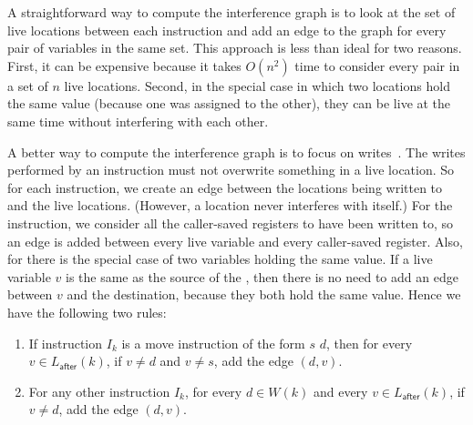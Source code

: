 \documentclass[7x10]{TimesAPriori_MIT}%
\numberwithin{theorem}{chapter}
\numberwithin{definition}{chapter}
\numberwithin{equation}{chapter}
\begin{document}
A straightforward way to compute the interference graph is to look at
the set of live locations between each instruction and add an edge to
the graph for every pair of variables in the same set.  This approach
is less than ideal for two reasons. First, it can be expensive because
it takes $O(n^2)$ time to consider every pair in a set of $n$ live
locations. Second, in the special case in which two locations hold the
same value (because one was assigned to the other), they can be live
at the same time without interfering with each other.

A better way to compute the interference graph is to focus on
writes~\citep{Appel:2003fk}. The writes performed by an instruction
must not overwrite something in a live location. So for each
instruction, we create an edge between the locations being written to
and the live locations. (However, a location never interferes with
itself.) For the  instruction, we consider all the
caller-saved registers to have been written to, so an edge is added
between every live variable and every caller-saved register. Also, for
 there is the special case of two variables holding the same
value. If a live variable $v$ is the same as the source of the
, then there is no need to add an edge between $v$ and the
destination, because they both hold the same value.
%
Hence we have the following two rules:

\begin{enumerate}
\item If instruction $I_k$ is a move instruction of the form
   $s$\key{,} $d$, then for every $v \in
  L_{\mathsf{after}}(k)$, if $v \neq d$ and $v \neq s$, add the edge
  $(d,v)$.

\item For any other instruction $I_k$, for every $d \in W(k)$ and
  every $v \in L_{\mathsf{after}}(k)$, if $v \neq d$, add the edge
  $(d,v)$.
\end{enumerate}
\end{document}
